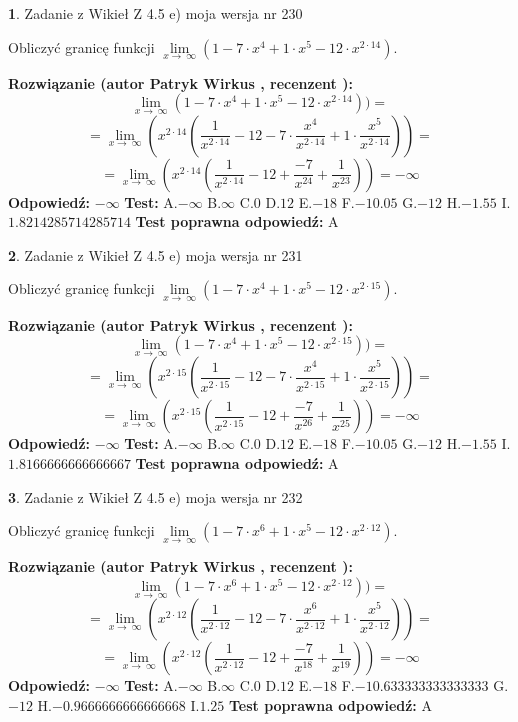 \documentclass[12pt, a4paper]{article}
\theoremstyle{definition} %
\newtheorem{zad}{}
\newcommand{\zadStart}[1]{\begin{zad}#1\newline}
\newcommand{\zadStop}{\end{zad}}
\newcommand{\rozwStart}[2]{\noindent \textbf{Rozwiązanie (autor #1 , recenzent #2): }\newline}
\newcommand{\rozwStop}{\newline}
\newcommand{\odpStart}{\noindent \textbf{Odpowiedź:}\newline}
\newcommand{\odpStop}{\newline}
\newcommand{\testStart}{\noindent \textbf{Test:}\newline}
\newcommand{\testStop}{\newline}
\newcommand{\kluczStart}{\noindent \textbf{Test poprawna odpowiedź:}\newline}
\newcommand{\kluczStop}{\newline}
\begin{document}
\zadStart{Zadanie z Wikieł Z 4.5 e) moja wersja nr 230}


Obliczyć granicę funkcji  $\lim\limits_{x\to\ \infty}(1 - 7 \cdot x^{4}+1 \cdot x^{5}- 12 \cdot x^{2\cdot14})$.
\zadStop
\rozwStart{Patryk Wirkus}{}
$$\lim\limits_{x\to\ \infty}(1 - 7 \cdot x^{4}+1 \cdot x^{5}- 12 \cdot x^{2\cdot14}))=$$
$$=\lim\limits_{x\to\ \infty}(x^{2\cdot14}(\frac{1}{x^{2\cdot14}}-12 -7 \cdot \frac{x^{4}}{x^{2\cdot14}}+1 \cdot \frac{x^{5}}{x^{2\cdot14}}))=$$
$$=\lim\limits_{x\to\ \infty}(x^{2\cdot14}(\frac{1}{x^{2\cdot14}}-12 + \frac{-7}{x^{24}}+ \frac{1}{x^{23}}))=-\infty$$
\rozwStop
\odpStart
$-\infty$
\odpStop
\testStart
A.$-\infty$ B.$\infty$ C.$0$ D.$12$ E.$-18$
F.$-10.05$ G.$-12$
H.$-1.55$
I.$1.8214285714285714$
\testStop
\kluczStart
A
\kluczStop



\zadStart{Zadanie z Wikieł Z 4.5 e) moja wersja nr 231}


Obliczyć granicę funkcji  $\lim\limits_{x\to\ \infty}(1 - 7 \cdot x^{4}+1 \cdot x^{5}- 12 \cdot x^{2\cdot15})$.
\zadStop
\rozwStart{Patryk Wirkus}{}
$$\lim\limits_{x\to\ \infty}(1 - 7 \cdot x^{4}+1 \cdot x^{5}- 12 \cdot x^{2\cdot15}))=$$
$$=\lim\limits_{x\to\ \infty}(x^{2\cdot15}(\frac{1}{x^{2\cdot15}}-12 -7 \cdot \frac{x^{4}}{x^{2\cdot15}}+1 \cdot \frac{x^{5}}{x^{2\cdot15}}))=$$
$$=\lim\limits_{x\to\ \infty}(x^{2\cdot15}(\frac{1}{x^{2\cdot15}}-12 + \frac{-7}{x^{26}}+ \frac{1}{x^{25}}))=-\infty$$
\rozwStop
\odpStart
$-\infty$
\odpStop
\testStart
A.$-\infty$ B.$\infty$ C.$0$ D.$12$ E.$-18$
F.$-10.05$ G.$-12$
H.$-1.55$
I.$1.8166666666666667$
\testStop
\kluczStart
A
\kluczStop



\zadStart{Zadanie z Wikieł Z 4.5 e) moja wersja nr 232}


Obliczyć granicę funkcji  $\lim\limits_{x\to\ \infty}(1 - 7 \cdot x^{6}+1 \cdot x^{5}- 12 \cdot x^{2\cdot12})$.
\zadStop
\rozwStart{Patryk Wirkus}{}
$$\lim\limits_{x\to\ \infty}(1 - 7 \cdot x^{6}+1 \cdot x^{5}- 12 \cdot x^{2\cdot12}))=$$
$$=\lim\limits_{x\to\ \infty}(x^{2\cdot12}(\frac{1}{x^{2\cdot12}}-12 -7 \cdot \frac{x^{6}}{x^{2\cdot12}}+1 \cdot \frac{x^{5}}{x^{2\cdot12}}))=$$
$$=\lim\limits_{x\to\ \infty}(x^{2\cdot12}(\frac{1}{x^{2\cdot12}}-12 + \frac{-7}{x^{18}}+ \frac{1}{x^{19}}))=-\infty$$
\rozwStop
\odpStart
$-\infty$
\odpStop
\testStart
A.$-\infty$ B.$\infty$ C.$0$ D.$12$ E.$-18$
F.$-10.633333333333333$ G.$-12$
H.$-0.9666666666666668$
I.$1.25$
\testStop
\kluczStart
A
\kluczStop
\end{document}
